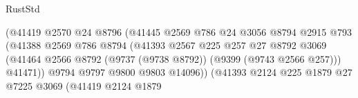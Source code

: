 \begin{lexlean}{RustStd}
\begin{coremodule}
                                                (@41419
                                                  @2570
                                                  @24
                                                  @8796
                                                  (@41445
                                                    @2569
                                                    @786
                                                    @24
                                                    @3056
                                                    @8794
                                                    @2915
                                                    @793
                                                    (@41388
                                                      @2569
                                                      @786
                                                      @8794
                                                      (@41393
                                                        @2567
                                                        @225
                                                        @257
                                                        @27
                                                        @8792
                                                        @3069
                                                        (@41464
                                                          @2566
                                                          @8792
                                                          (@9737 (@9738 @8792))
                                                          (@9399 (@9743 @2566 @257)))
                                                        @41471))
                                                    @9794
                                                    @9797
                                                    @9800
                                                    @9803
                                                    @14096))
                                                (@41393
                                                  @2124
                                                  @225
                                                  @1879
                                                  @27
                                                  @7225
                                                  @3069
                                                  (@41419
                                                    @2124
                                                    @1879

\end{coremodule}
\end{lexlean}
